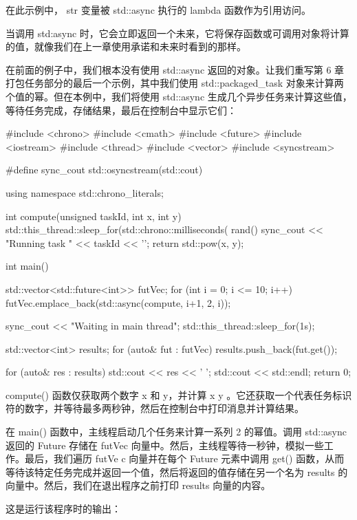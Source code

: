 在此示例中， str 变量被 std::async 执行的 lambda 函数作为引用访问。


当调用 std:async 时，它会立即返回一个未来，它将保存函数或可调用对象将计算的值，就像我们在上一章使用承诺和未来时看到的那样。

在前面的例子中，我们根本没有使用 std::async 返回的对象。让我们重写第 6 章打包任务部分的最后一个示例，其中我们使用 std::packaged\_task 对象来计算两个值的幂。但在本例中，我们将使用 std::async 生成几个异步任务来计算这些值，等待任务完成，存储结果，最后在控制台中显示它们：

\begin{cpp}
#include <chrono>
#include <cmath>
#include <future>
#include <iostream>
#include <thread>
#include <vector>
#include <syncstream>

#define sync_cout std::osyncstream(std::cout)

using namespace std::chrono_literals;

int compute(unsigned taskId, int x, int y) {
    std::this_thread::sleep_for(std::chrono::milliseconds(
                                rand() %
    sync_cout << "Running task " << taskId << '\n';
    return std::pow(x, y);
}

int main() {
    std::vector<std::future<int>> futVec;
    for (int i = 0; i <= 10; i++)
        futVec.emplace_back(std::async(compute,
                            i+1, 2, i));

    sync_cout << "Waiting in main thread\n";
    std::this_thread::sleep_for(1s);

    std::vector<int> results;
    for (auto& fut : futVec)
        results.push_back(fut.get());

    for (auto& res : results)
        std::cout << res << ' ';
    std::cout << std::endl;
    return 0;
}
\end{cpp}

compute() 函数仅获取两个数字 x 和 y，并计算 x y 。它还获取一个代表任务标识符的数字，并等待最多两秒钟，然后在控制台中打印消息并计算结果。

在 main() 函数中，主线程启动几个任务来计算一系列 2 的幂值。调用 std::async 返回的 Future 存储在 futVec 向量中。然后，主线程等待一秒钟，模拟一些工作。最后，我们遍历 futVe c 向量并在每个 Future 元素中调用 get() 函数，从而等待该特定任务完成并返回一个值，然后将返回的值存储在另一个名为 results 的向量中。然后，我们在退出程序之前打印 results 向量的内容。

这是运行该程序时的输出：

